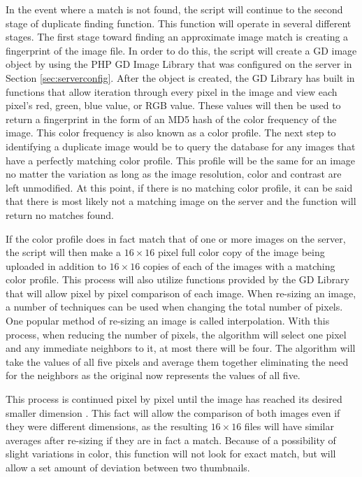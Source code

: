 In the event where a match is not found, the script will continue to the second stage of duplicate finding function. This function will operate in several different stages. The first stage toward finding an approximate image match is creating a fingerprint of the image file. In order to do this, the script will create a GD image object by using the PHP GD Image Library that was configured on the server in Section \ref{sec:serverconfig}. After the object is created, the GD Library has built in functions that allow iteration through every pixel in the image and view each pixel's red, green, blue value, or RGB value. These values will then be used to return a fingerprint in the form of an MD5 hash of the color frequency of the image. This color frequency is also known as a color profile. The next step to identifying a duplicate image would be to query the database for any images that have a perfectly matching color profile. This profile will be the same for an image no matter the variation as long as the image resolution, color and contrast are left unmodified. At this point, if there is no matching color profile, it can be said that there is most likely not a matching image on the server and
the function will return no matches found.

If the color profile does in fact match that of one or more images on the server, the script will then make a $16\times16$ pixel full color copy of the image being uploaded in addition to $16\times16$ copies of each of the images with a matching color profile. This process will also utilize functions provided by the GD Library that will allow pixel by pixel comparison of each image. When re-sizing an image, a number of techniques can be used when changing the total number of pixels. One popular method of re-sizing an image is called interpolation. With this process, when reducing the number of pixels, the algorithm will select one pixel and any immediate neighbors to it, at most there will be four. The algorithm will take the values of all five pixels and average them together eliminating the need for the neighbors as the original now represents the values of all five.

This process is continued pixel by pixel until the image has reached its desired smaller dimension \cite{Acharya:2007}. This fact will allow the comparison of both images even if they were different dimensions, as the resulting $16\times16$ files will have similar averages after re-sizing if they are in fact a match. Because of a possibility of slight variations in color, this function will not look for exact match, but will allow a set amount of deviation between two thumbnails.

